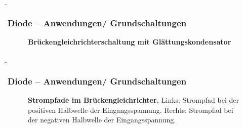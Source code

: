 \begin{frame}
    \b{ \frametitle{Diode -- Anwendungen/ Grundschaltungen}
        \begin{figure}[H]
            \centering
            
            \caption{\textbf{Brückengleichrichterschaltung mit Glättungskondensator}} 
        \end{figure}
    }
\end{frame}

\begin{frame}
    \b{ \frametitle{Diode -- Anwendungen/ Grundschaltungen}
        \begin{figure}[H]
            \begin{minipage}[c]{0.48\textwidth}
                \raggedright
                
            \end{minipage}
            \begin{minipage}[c]{0.48\textwidth}
                \raggedleft
                
            \end{minipage}
        
            \caption{\textbf{Strompfade im Brückengleichrichter.} Links: Strompfad bei der positiven Halbwelle der 
            Eingangsspannung. Rechts: Strompfad bei der negativen Halbwelle der Eingangsspannung.} 
        \end{figure}
    }
\end{frame}

